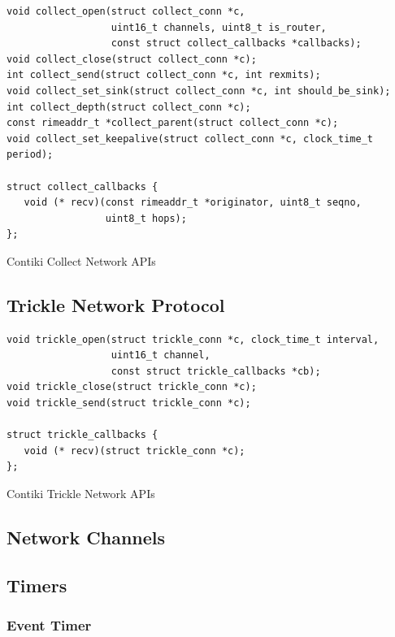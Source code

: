 \begin{listing}[H]
\begin{verbatim}
void collect_open(struct collect_conn *c,
                  uint16_t channels, uint8_t is_router,
                  const struct collect_callbacks *callbacks);
void collect_close(struct collect_conn *c);
int collect_send(struct collect_conn *c, int rexmits);
void collect_set_sink(struct collect_conn *c, int should_be_sink);
int collect_depth(struct collect_conn *c);
const rimeaddr_t *collect_parent(struct collect_conn *c);
void collect_set_keepalive(struct collect_conn *c, clock_time_t period);

struct collect_callbacks {
   void (* recv)(const rimeaddr_t *originator, uint8_t seqno,
                 uint8_t hops);
};
\end{verbatim}
\caption{Contiki Collect Network APIs}
\end{listing}


\subsection{Trickle Network Protocol}

\begin{listing}[H]
\begin{verbatim}
void trickle_open(struct trickle_conn *c, clock_time_t interval,
                  uint16_t channel,
                  const struct trickle_callbacks *cb);
void trickle_close(struct trickle_conn *c);
void trickle_send(struct trickle_conn *c);

struct trickle_callbacks {
   void (* recv)(struct trickle_conn *c);
};
\end{verbatim}
\caption{Contiki Trickle Network APIs}
\end{listing}


\subsection{Network Channels}




\subsection{Timers}

\subsubsection{Event Timer}

